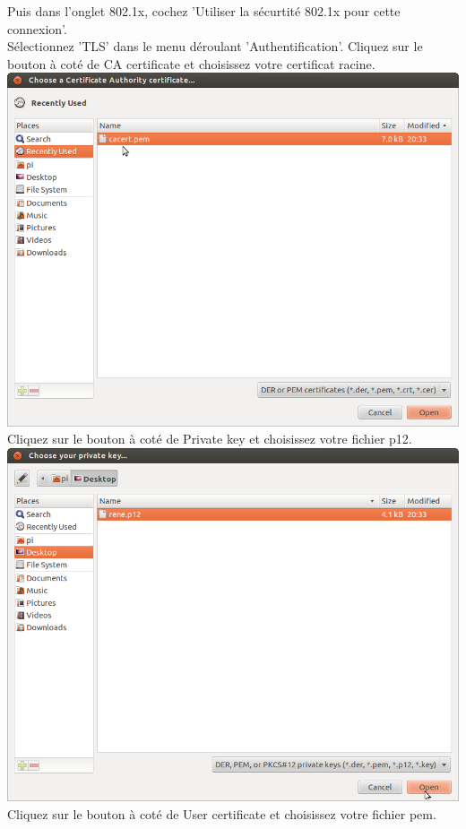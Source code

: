 Puis dans l'onglet 802.1x, cochez 'Utiliser la sécurtité 802.1x pour cette connexion'.\\
Sélectionnez 'TLS' dans le menu déroulant 'Authentification'. 
Cliquez sur le bouton à coté de CA certificate et choisissez votre certificat racine.\\
\includegraphics[width=\screenShotSize{}]{imgUser/selectCacert.png}\\
Cliquez sur le bouton à coté de Private key et choisissez votre fichier p12.\\
\includegraphics[width=\screenShotSize{}]{imgUser/selectP12.png}\\
Cliquez sur le bouton à coté de User certificate et choisissez votre fichier pem.\\
